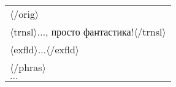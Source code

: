 \begin{multicols}{2}
{\begin{tabular}{l}
  \hspace*{10mm}$\langle$/{\sf orig}$\rangle$\\
  \hspace*{10mm}$\langle${\sf trnsl}$\rangle$$\ldots$, просто фантастика!$\langle$/{\sf trnsl}$\rangle$\\
  \hspace*{10mm}$\langle${\sf exfld}$\rangle$$\ldots$$\langle$/{\sf exfld}$\rangle$\\
  \hspace*{8mm}$\langle$/{\sf phras}$\rangle$\\
  \hspace*{8mm}$\ldots$

  \end{tabular}
  
  }
  
\vspace*{0.5pt}
 
  \pagebreak
  

\end{multicols}
